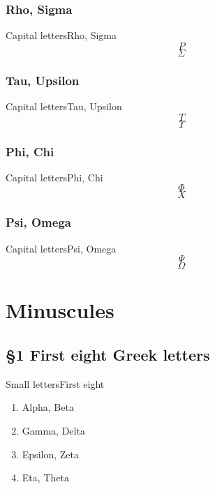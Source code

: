 \documentclass{beamer}
\begin{document}
         \subsubsection{Rho, Sigma}
            \begin{frame}{Capital letters}{Rho, Sigma}
               \[ P \]
               \[ \Sigma \]
            \end{frame}
         \subsubsection{Tau, Upsilon}
            \begin{frame}{Capital letters}{Tau, Upsilon}
               \[ T \]
               \[ \Upsilon \]
            \end{frame}
         \subsubsection{Phi, Chi}
            \begin{frame}{Capital letters}{Phi, Chi}
               \[ \Phi \]
               \[ X \]
            \end{frame}
         \subsubsection{Psi, Omega}
            \begin{frame}{Capital letters}{Psi, Omega}
               \[ \Psi \]
               \[ \Omega \]
            \end{frame}
   \section{Minuscules}
      \subsection{§1 First eight Greek letters}
         \begin{frame}{Small letters}{First eight}
            \begin{enumerate}
               \item Alpha, Beta
               \item Gamma, Delta
               \item Epsilon, Zeta
               \item Eta, Theta
            \end{enumerate}
         \end{frame}
\end{document}
